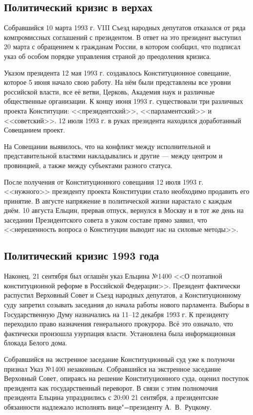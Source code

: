 \subsection{Политический кризис в верхах}

Собравшийся 10 марта 1993 г. VIII Съезд народных депутатов отказался от ряда компромиссных соглашений с президентом. В ответ на это президент выступил 20 марта с обращением к гражданам России, в котором сообщил, что подписал указ об особом порядке управления страной до преодоления кризиса.

Указом президента 12 мая 1993 г. создавалось Конституционное совещание, которое 5 июня начало свою работу. На нём были представлены все уровни российской власти, все её ветви, Церковь, Академия наук и различные общественные организации. К концу июня 1993 г. существовали три различных проекта Конституции: <<президентский>>, <<парламентский>> и <<советский>>. 12 июля 1993 г. в руках президента находился доработанный Совещанием проект.

На Совещании выявилось, что на конфликт между исполнительной и представительной властями накладывались и другие --- между центром и провинцией, а также между субъектами разного статуса.

После получения от Конституционного совещания 12 июля 1993 г. <<нужного>> президенту проекта Конституции стало необходимо продавить его принятие. В августе напряжение в политической жизни нарастало с каждым днём. 10 августа Ельцин, прервав отпуск, вернулся в Москву и в тот же день на заседании Президентского совета в узком составе прямо заявил, что <<нерешенность вопроса о Конституции выводит нас на силовые методы>>.

\subsection{Политический кризис 1993 года}

Наконец, 21 сентября был оглашён указ Ельцина №1400 <<О поэтапной конституционной реформе в Российской Федерации>>. Президент фактически распустил Верховный Совет и Съезд народных депутатов, а Конституционному суду запретил созывать заседания до начала работы нового парламента. Выборы в Государственную Думу назначались на 11--12 декабря 1993 г. К президенту переходило право назначения генерального прокурора. Всё это означало, что фактически произошла узурпация власти. Установлена была информационная блокада Белого дома.

Собравшийся на экстренное заседание Конституционный суд уже к полуночи признал Указ №1400 незаконным. Собравшийся на экстренное заседание Верховный Совет, опираясь на решение Конституционного суда, оценил поступок президента как государственный переворот. В связи с этим полномочия президента Ельцина упразднились с 20:00 21 сентября, а президентские обязанности надлежало исполнять вице"=президенту А.~В.~Руцкому.

